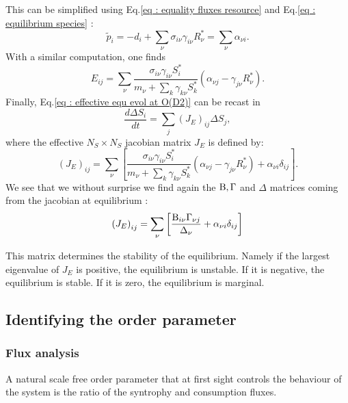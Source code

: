 \documentclass[12pt]{report}
\begin{document}
This can be simplified using Eq.\eqref{eq : equality fluxes resource} and Eq.\eqref{eq : equilibrium species} :
\begin{equation}
\tilde{p}_i=-d_i +\sum_\nu \sigma_{i\nu}\gamma_{i\nu}R^*_\nu = \sum_\nu \alpha_{\nu i}.
\end{equation}
With a similar computation, one finds
\begin{equation}
E_{ij}=\sum_\nu \frac{\sigma_{i\nu}\gamma_{i\nu}S^*_i}{m_\nu+\sum_k \gamma_{k\nu}S^*_k} \left(\alpha_{\nu j}-\gamma_{j\nu}R^*_\nu\right).
\end{equation}
Finally, Eq.\eqref{eq : effective equ evol at O(D2)} can be recast in
\begin{equation}
\frac{d\Delta S_i}{dt} = \sum_j (J_E)_{ij} \Delta S_j,
\end{equation}
where the effective $N_S\times N_S$ jacobian matrix $J_E$ is defined by:
\begin{equation}
(J_E)_{ij}=\sum_\nu \left[\frac{\sigma_{i\nu}\gamma_{i\nu}S^*_i}{m_\nu+\sum_k \gamma_{k\nu}S^*_k} \left(\alpha_{\nu j}-\gamma_{j\nu}R^*_\nu\right)+\alpha_{\nu i}\delta_{ij}\right].
\end{equation}
We see that we without surprise we find again the $\text{B}, \Gamma $ and $\Delta$ matrices coming from the jacobian at equilibrium :
\begin{equation}
\left(J_E\right)_{ij}=\sum_\nu \left[\frac{\text{B}_{i\nu}\Gamma_{\nu j}}{\Delta_\nu}+\alpha_{\nu i} \delta_{ij}\right]
\end{equation}

This matrix determines the stability of the equilibrium. Namely if the largest eigenvalue of $J_E$ is positive, the equilibrium is unstable. If it is negative, the equilibrium is stable. If it is zero, the equilibrium is marginal.



\subsection{Identifying the order parameter}
\subsubsection{Flux analysis}
A natural scale free order parameter that at first sight controls the behaviour of the system is the ratio of the syntrophy and consumption fluxes.
\end{document}
